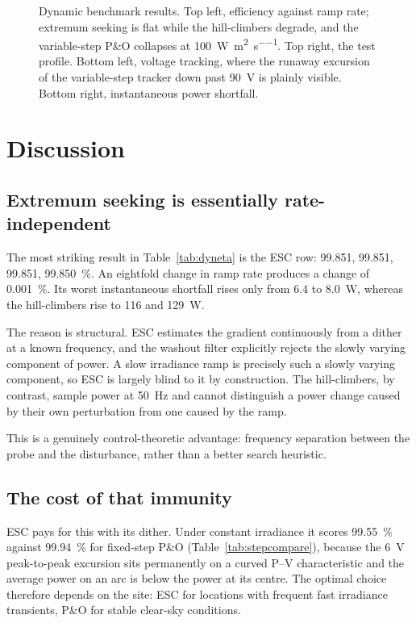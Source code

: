 \begin{figure}[htbp]
\centering
{}
\caption[Dynamic MPPT benchmark]{Dynamic benchmark results. Top left, efficiency against ramp rate; extremum seeking is flat while the hill-climbers degrade, and the variable-step P\&O collapses at \SI{100}{\watt\per\square\metre\per\second}. Top right, the test profile. Bottom left, voltage tracking, where the runaway excursion of the variable-step tracker down past \SI{90}{\volt} is plainly visible. Bottom right, instantaneous power shortfall.}
\label{fig:benchmark}
\end{figure}

\section{Discussion}

\subsection{Extremum seeking is essentially rate-independent}

The most striking result in Table~\ref{tab:dyneta} is the ESC row: \SI{99.851}{},
\SI{99.851}{}, \SI{99.851}{}, \SI{99.850}{\percent}. An eightfold change in ramp
rate produces a change of \SI{0.001}{\percent}. Its worst instantaneous
shortfall rises only from \SI{6.4}{} to \SI{8.0}{\watt}, whereas the
hill-climbers rise to \SI{116}{} and \SI{129}{\watt}.

The reason is structural. ESC estimates the gradient continuously from a dither
at a known frequency, and the washout filter explicitly rejects the slowly
varying component of power. A slow irradiance ramp is precisely such a slowly
varying component, so ESC is largely blind to it by construction. The
hill-climbers, by contrast, sample power at \SI{50}{\hertz} and cannot
distinguish a power change caused by their own perturbation from one caused by
the ramp.

This is a genuinely control-theoretic advantage: frequency separation between
the probe and the disturbance, rather than a better search heuristic.

\subsection{The cost of that immunity}

ESC pays for this with its dither. Under constant irradiance it scores
\SI{99.55}{\percent} against \SI{99.94}{\percent} for fixed-step P\&O
(Table~\ref{tab:stepcompare}), because the \SI{6}{\volt} peak-to-peak excursion
sits permanently on a curved P--V characteristic and the average power on an arc
is below the power at its centre. The optimal choice therefore depends on the
site: ESC for locations with frequent fast irradiance transients, P\&O for
stable clear-sky conditions.

